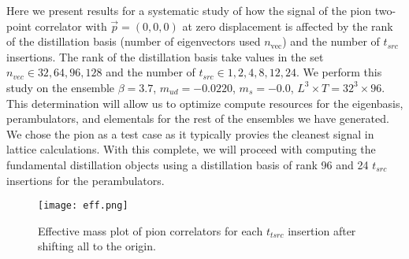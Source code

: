 Here we present results for a systematic study of how the signal of the pion two-point correlator with $\vec{p}=(0,0,0)$ at zero displacement is affected by the rank of the distillation basis (number of eigenvectors used $n_{\text{vec}}$) and the number of $t_{src}$ insertions. The rank of the distillation basis take values in the set $n_{vec}\in {32,64,96,128}$ and the number of $t_{src} \in {1,2,4,8,12,24}$. We perform this study on the ensemble $\beta = 3.7$, $m_{ud}=-0.0220$, $m_s = -0.0$, $L^3 \times T = 32^3\times96$. This determination will allow us to optimize compute resources for the eigenbasis, perambulators, and elementals for the rest of the ensembles we have generated. We chose the pion as a test case as it typically provies the cleanest signal in lattice calculations. With this complete, we will proceed with computing the fundamental distillation objects using a distillation basis of rank 96 and 24 $t_{src}$ insertions for the perambulators.  



\begin{figure}[h]
    \centering
    \texttt{[image: eff.png]}
    \caption{Effective mass plot of pion correlators for each $t_{tsrc}$ insertion after shifting all to the origin.}
    \label{fig:figure10}
\end{figure}

